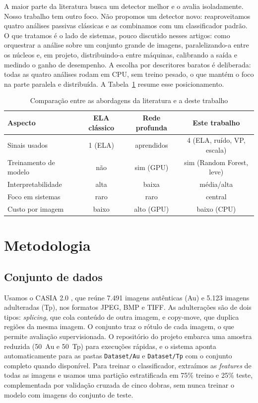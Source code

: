 \documentclass[12pt]{article}
\begin{document}
A maior parte da literatura busca um detector melhor e o avalia isoladamente.
Nosso trabalho tem outro foco. Não propomos um detector novo: reaproveitamos
quatro análises passivas clássicas e as combinamos com um classificador padrão.
O que tratamos é o lado de sistemas, pouco discutido nesses artigos: como
orquestrar a análise sobre um conjunto grande de imagens, paralelizando-a entre
os núcleos e, em projeto, distribuindo-a entre máquinas, calibrando a saída e
medindo o ganho de desempenho. A escolha por descritores baratos é deliberada:
todas as quatro análises rodam em CPU, sem treino pesado, o que mantém o foco na
parte paralela e distribuída. A Tabela~\ref{tab:comparativo} resume esse
posicionamento.

\begin{table}[ht]
\centering
\caption{Comparação entre as abordagens da literatura e a deste trabalho}
\label{tab:comparativo}
\begin{tabular}{lccc}
\toprule
\textbf{Aspecto} & \textbf{ELA clássico} & \textbf{Rede profunda} & \textbf{Este trabalho} \\
\midrule
Sinais usados          & 1 (ELA)     & aprendidos   & 4 (ELA, ruído, VP, escala) \\
Treinamento de modelo  & não         & sim (GPU)    & sim (Random Forest, leve) \\
Interpretabilidade     & alta        & baixa        & média/alta \\
Foco em sistemas       & raro        & raro         & central \\
Custo por imagem       & baixo       & alto (GPU)   & baixo (CPU) \\
\bottomrule
\end{tabular}
\end{table}

\section{Metodologia}

\subsection{Conjunto de dados}

Usamos o CASIA 2.0 \cite{dong2013casia}, que reúne 7.491 imagens autênticas (Au)
e 5.123 imagens adulteradas (Tp), nos formatos JPEG, BMP e TIFF. As adulterações
são de dois tipos: \textit{splicing}, que cola conteúdo de outra imagem, e
copy-move, que duplica regiões da mesma imagem. O conjunto traz o rótulo de cada
imagem, o que permite avaliação supervisionada. O repositório do projeto embarca
uma amostra reduzida (50~Au e 50~Tp) para execuções rápidas, e o sistema aponta
automaticamente para as pastas \texttt{Dataset/Au} e \texttt{Dataset/Tp} com o
conjunto completo quando disponível. Para treinar o classificador, extraímos as
\textit{features} de todas as imagens e usamos uma partição estratificada em 75\%
treino e 25\% teste, complementada por validação cruzada de cinco dobras, sem
nunca treinar o modelo com imagens do conjunto de teste.
\end{document}
